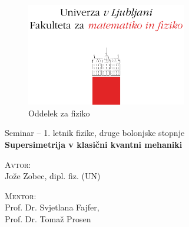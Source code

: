 \begin{titlepage}
	\begin{figure}[H]
		\centering
		\includegraphics[width = 7cm, keepaspectratio=1]{pics/logo.pdf}\\[12pt]
		{\sc Oddelek za fiziko}\\[4cm]
	\end{figure}
	\begin{center}
		\large{Seminar -- 1. letnik fizike, druge bolonjske stopnje}\\[0.5cm]
		\LARGE\textbf{Supersimetrija v klasi\v cni kvantni mehaniki}\\[1.0cm]

		\vspace{0.0cm}

		\begin{minipage}{0.4\textwidth}\small
			\begin{flushleft}
			\textsc{Avtor:}\\[0.2cm]
			Jo\v ze Zobec, dipl. fiz. (UN)
			\end{flushleft}
		\end{minipage}
		\begin{minipage}{0.4\textwidth}\small
			\begin{flushright}
				\textsc{Mentor:}\\[0.2cm]
				Prof. Dr. Svjetlana Fajfer,\\[0.1cm]
				Prof. Dr. Toma\v z Prosen
			\end{flushright}
		\end{minipage}
	\end{center}

	\vspace{5.0cm}

	\begin{abstract}
		Supersimetrija je \v sir\v se podro\v cje, ki ni omejeno zgolj na fiziko osnovnih
		delcev, pa\v c pa na celotno kvantni mehaniko. V tem seminarju bom pokazal
		ra\v cunske prijeme v obravnavi klasi\v cnih kvantno-mehanskih problemih s pomo\v cjo
		supersimetri\v cnega ogrodja in novosti v teoriji izospektralnih Hamiltonianov ter
		teoriji perturbacij.
	\end{abstract}
	
	\vfill

\end{titlepage}

